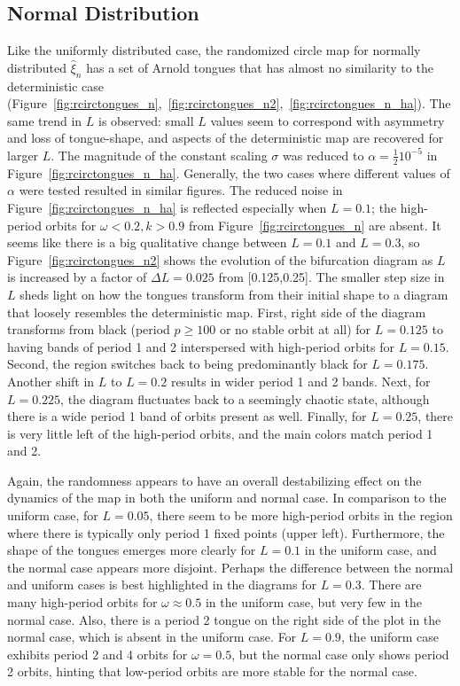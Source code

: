 \subsection{Normal Distribution}
Like the uniformly distributed case, the randomized circle map for
normally distributed $\hat{\xi}_n$ has a set of Arnold tongues that
has almost no similarity to the deterministic case (Figure~\ref{fig:rcirctongues_n},~\ref{fig:rcirctongues_n2},~\ref{fig:rcirctongues_n_ha}). The same trend in $L$ is observed: small $L$ values seem to correspond
with asymmetry and loss of tongue-shape, and aspects of the
deterministic map are recovered for larger $L$. The magnitude of the
constant scaling $\sigma$ was reduced to $\alpha = \frac{1}{2}10^{-5}$
in Figure~\ref{fig:rcirctongues_n_ha}. Generally, the two cases where
different values of $\alpha$ were tested resulted in similar figures. The reduced noise in Figure~\ref{fig:rcirctongues_n_ha}
is reflected especially when $L=0.1$; the high-period orbits for
$\omega < 0.2, k > 0.9$ from Figure~\ref{fig:rcirctongues_n} are
absent. It seems like there is a big qualitative change between
$L=0.1$ and $L=0.3$, so Figure~\ref{fig:rcirctongues_n2} shows the
evolution of the bifurcation diagram as $L$ is increased by a factor
of $\Delta L=0.025$ from [0.125,0.25]. The smaller step size in $L$
sheds light on how the tongues transform from their initial shape to a
diagram that loosely resembles the deterministic map. First, right
side of the diagram transforms from black (period $p \geq 100$ or no stable
orbit at all) for $L=0.125$ to having bands of period 1 and 2 interspersed with
high-period orbits for $L=0.15$. Second, the region switches back to
being predominantly black for $L=0.175$. Another shift in $L$ to
$L=0.2$ results in wider period 1 and 2 bands. Next, for $L=0.225$,
the diagram fluctuates back to a seemingly chaotic state, although
there is a wide period 1 band of orbits present as well. Finally, for
$L=0.25$, there is very little left of the high-period orbits, and the
main colors match period 1 and 2. 

Again, the randomness appears to have an overall destabilizing effect on the dynamics of the
map in both the uniform and normal case. In comparison to the uniform case, for $L=0.05$, there seem to be
more high-period orbits in the region where there is typically only
period 1 fixed points (upper left). Furthermore, the shape of the
tongues emerges more clearly for $L=0.1$ in the uniform case, and the
normal case appears more disjoint. Perhaps the difference between the
normal and uniform cases is best highlighted in the diagrams for
$L=0.3$. There are many high-period orbits for $\omega \approx 0.5$ in
the uniform case, but very few in the normal case. Also, there is a period
2 tongue on the right side of the plot in the normal case, which is
absent in the uniform case. For $L=0.9$, the uniform case exhibits period 2 and 4 orbits
for $\omega=0.5$, but the normal case only shows period 2 orbits, hinting that low-period orbits are more stable for the normal case. 

